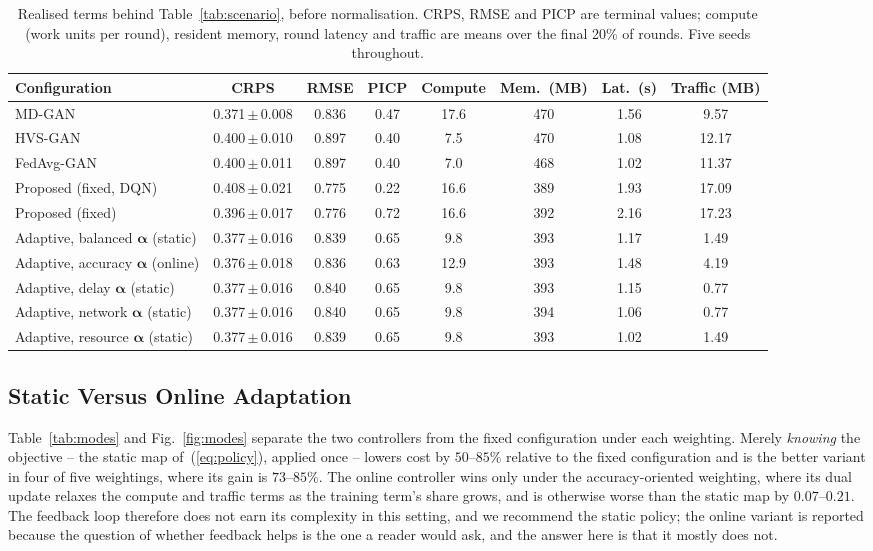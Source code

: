 \documentclass[journal]{IEEEtran}
\newcommand{\valpha}{\boldsymbol{\alpha}}
\begin{document}
\begin{table}[!t]
\centering
\caption{Realised terms behind Table~\ref{tab:scenario}, before normalisation.
CRPS, RMSE and PICP are terminal values; compute (work units per round),
resident memory, round latency and traffic are means over the final 20\% of
rounds. Five seeds throughout.}
\label{tab:terms}
\begin{tabular}{lccccccc}
\toprule
Configuration & CRPS & RMSE & PICP & Compute & Mem.\ (MB) & Lat.\ (s) & Traffic (MB) \\
\midrule
MD-GAN & 0.371\,$\pm$\,0.008 & 0.836 & 0.47 & 17.6 & 470 & 1.56 & 9.57 \\
HVS-GAN & 0.400\,$\pm$\,0.010 & 0.897 & 0.40 & 7.5 & 470 & 1.08 & 12.17 \\
FedAvg-GAN & 0.400\,$\pm$\,0.011 & 0.897 & 0.40 & 7.0 & 468 & 1.02 & 11.37 \\
Proposed (fixed, DQN) & 0.408\,$\pm$\,0.021 & 0.775 & 0.22 & 16.6 & 389 & 1.93 & 17.09 \\
Proposed (fixed) & 0.396\,$\pm$\,0.017 & 0.776 & 0.72 & 16.6 & 392 & 2.16 & 17.23 \\
\midrule
Adaptive, balanced $\valpha$ (static) & 0.377\,$\pm$\,0.016 & 0.839 & 0.65 & 9.8 & 393 & 1.17 & 1.49 \\
Adaptive, accuracy $\valpha$ (online) & 0.376\,$\pm$\,0.018 & 0.836 & 0.63 & 12.9 & 393 & 1.48 & 4.19 \\
Adaptive, delay $\valpha$ (static) & 0.377\,$\pm$\,0.016 & 0.840 & 0.65 & 9.8 & 393 & 1.15 & 0.77 \\
Adaptive, network $\valpha$ (static) & 0.377\,$\pm$\,0.016 & 0.840 & 0.65 & 9.8 & 394 & 1.06 & 0.77 \\
Adaptive, resource $\valpha$ (static) & 0.377\,$\pm$\,0.016 & 0.839 & 0.65 & 9.8 & 393 & 1.02 & 1.49 \\
\bottomrule
\end{tabular}
\end{table}

\subsection{Static Versus Online Adaptation}
\label{sec:modes}
Table~\ref{tab:modes} and Fig.~\ref{fig:modes} separate the two controllers
from the fixed configuration under each weighting. Merely \emph{knowing} the
objective -- the static map of~(\ref{eq:policy}), applied once -- lowers cost
by $50$--$85\%$ relative to the fixed configuration and is the better variant
in four of five weightings, where its gain is $73$--$85\%$. The online controller wins only under the
accuracy-oriented weighting, where its dual update relaxes the compute and
traffic terms as the training term's share grows, and is otherwise worse than
the static map by $0.07$--$0.21$. The feedback loop therefore does not earn its
complexity in this setting, and we recommend the static policy; the online
variant is reported because the question of whether feedback helps is the one a
reader would ask, and the answer here is that it mostly does not.
\end{document}
